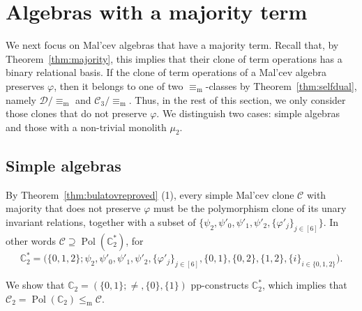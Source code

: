\documentclass[12pt]{amsart}
\theoremstyle{definition}
\theoremstyle{definition}
\newcommand{\struct}[1]{\mathbb{#1}}
\newcommand{\clo}[1]{\mathcal{#1}}
\DeclareMathOperator{\Pol}{Pol}
\newcommand{\isaminorof}{\leq_{\mathrm{m}}}
\newcommand{\minorequivalentto}{\equiv_{\mathrm{m}}}
\begin{document}
\section{Algebras with a majority term} \label{sec:SDmeet}

We next focus on Mal'cev algebras that have a majority term. 
Recall that, by Theorem~\ref{thm:majority}, 
this implies that their clone of term operations has a binary relational basis. 
If the clone of term operations of a Mal'cev algebra preserves $\varphi$, 
then it belongs to one of two $\minorequivalentto$-classes by Theorem~\ref{thm:selfdual}, 
namely $\clo{D}/\minorequivalentto$ and $\clo{C}_3/\minorequivalentto$. 
Thus, in the rest of this section, we only consider  those clones that do not preserve $\varphi$. 
We distinguish two cases: simple algebras and those with a non-trivial monolith $\mu_2$.

\subsection{Simple algebras}

By Theorem~\ref{thm:bulatovreproved} (1), every simple Mal'cev clone $\clo{C}$ with majority that does not preserve $\varphi$ must be the polymorphism clone of its unary invariant relations, together with a subset of $\{\psi_2,\psi'_0,\psi'_1,\psi'_2,\{\varphi'_j\}_{j\in[6]}\}$. In other words
$\clo{C} \supseteq \Pol(\struct{C}^{*}_2)$, for 
\[\struct{C}^{*}_2=\Big(\{0,1,2\};\psi_2,\psi'_0,\psi'_1,\psi'_2,\{\varphi'_j\}_{j\in[6]},\{0,1\},\{0,2\},\{1,2\},\{i\}_{i\in\{0,1,2\}}\Big).\]

We show that $\struct{C}_2 = (\{0,1\};\neq,\{0\},\{1\})$ pp-constructs $\struct{C}_2^{*}$, which implies that $\mathcal C_2 = \Pol(\struct{C}_2) \isaminorof \mathcal C$.
\end{document}
